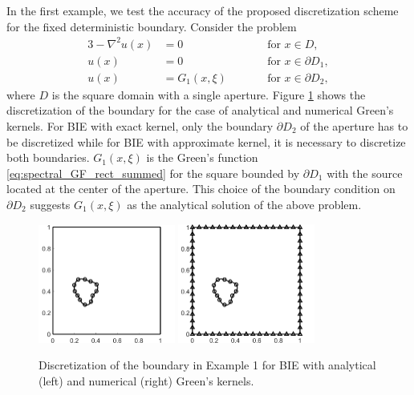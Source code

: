 In the first example, we test the accuracy of the proposed discretization scheme for the fixed deterministic boundary.
Consider the problem
\begin{alignat*}{3}
	-\nabla^2 u(x) & = 0  &\qquad &\text{for } x \in D,
	\\ \nonumber
	u(x)           & = 0  &\qquad &\text{for } x \in \partial D_1,
	\\ \nonumber
	u(x)           & = G_1(x,\xi)  &\qquad &\text{for } x \in \partial D_2,
\end{alignat*}
where $D$ is the square domain with a single aperture. %
Figure \ref{fig:ex1_mesh_a} shows the discretization of the boundary for the case of analytical and numerical Green's kernels. 
For BIE with exact kernel, only the boundary $\partial D_2$ of the aperture has to be discretized while for BIE with approximate kernel, it is necessary to discretize both boundaries.
$G_1(x,\xi)$ is the Green's function \eqref{eq:spectral_GF_rect_summed} for the square bounded by $\partial D_1$ with the source located at the center of the aperture.
This choice of the boundary condition on $\partial D_2$ suggests $G_1(x,\xi)$ as the analytical solution of the above problem.



\begin{figure}[!t]
	\centering
    \includegraphics[width=0.4\textwidth]{IV_ex1_mesh1}
    \qquad
    \includegraphics[width=0.4\textwidth]{IV_ex1_mesh2}
	\caption[Discretization of the boundary.]{ Discretization of the boundary in Example 1 for BIE with analytical (left) and numerical (right) Green's kernels. }
	\label{fig:ex1_mesh_a}
\end{figure}


